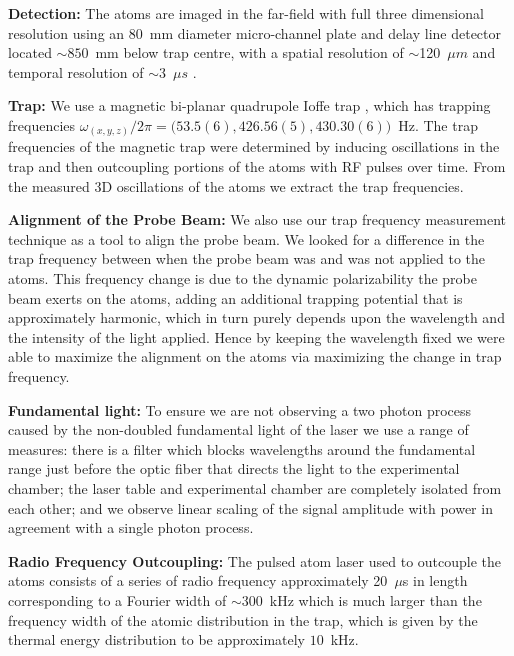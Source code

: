 \documentclass[%
 amsmath,amssymb,
aps,
]{revtex4-2}
\begin{document}
\textbf{Detection:} The atoms are imaged in the far-field with full three dimensional resolution using an \(80\)~mm diameter micro-channel plate and delay line detector located \(\sim\)\(850\)~mm below trap centre, with a spatial resolution of \(\sim\)120~\(\mu m\) and temporal resolution of \(\sim\)3~\(\mu s\) \cite{Manning:10}.
 
 \textbf{Trap:} We use a magnetic bi-planar quadrupole Ioffe trap \cite{Dall2007}, which has trapping frequencies \(\omega_{(x,y,z)}/2\pi=\big(53.5(6),426.56(5),430.30(6)\big)\)~Hz. The trap frequencies of the magnetic trap were determined by inducing oscillations in the trap and then outcoupling portions of the atoms with RF pulses over time. From the measured 3D oscillations of the atoms we extract the trap frequencies.
 
 
\textbf{Alignment of the Probe Beam:} We also use our trap frequency measurement technique as a tool to align the probe beam. We looked for a difference in the trap frequency between when the probe beam was and was not applied to the atoms. This frequency change is due to the dynamic polarizability the probe beam exerts on the atoms, adding an additional trapping potential that is approximately harmonic, which in turn purely depends upon the wavelength and the intensity of the light applied. Hence by keeping the wavelength fixed we were able to maximize the alignment on the atoms via maximizing the change in trap frequency.

\textbf{Fundamental light:} To ensure we are not observing a two photon process caused by the non-doubled fundamental light of the laser we use a range of measures: there is a filter which blocks wavelengths around the fundamental range just before the optic fiber that directs the light to the experimental chamber; the laser table and experimental chamber are completely isolated from each other; and we observe linear scaling of the signal amplitude with power in agreement with a single photon process.

\textbf{Radio Frequency Outcoupling:} The pulsed atom laser used to outcouple the atoms consists of a series of radio frequency  approximately 20~\(\mu\)s in length corresponding to a Fourier width of \(\sim 300\)~kHz \cite{Manning:10} which is much larger than the frequency width of the atomic distribution in the trap, which is given by the thermal energy distribution to be approximately \(10\)~kHz.
\end{document}
